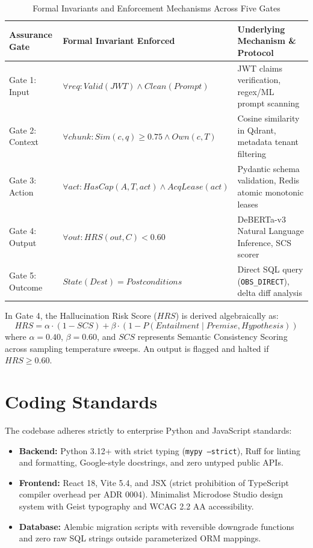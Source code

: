 \documentclass[12pt,a4paper]{report}
\numberwithin{equation}{section}
\begin{document}
\begin{table}[h!]
\centering
\caption{Formal Invariants and Enforcement Mechanisms Across Five Gates}
\vspace{4pt}
\begin{tabularx}{\textwidth}{l p{4.0cm} X}
\toprule
\textbf{Assurance Gate} & \textbf{Formal Invariant Enforced} & \textbf{Underlying Mechanism \& Protocol} \\
\midrule
Gate 1: Input & $\forall req: Valid(JWT) \land Clean(Prompt)$ & JWT claims verification, regex/ML prompt scanning \\
Gate 2: Context & $\forall chunk: Sim(c, q) \ge 0.75 \land Own(c, T)$ & Cosine similarity in Qdrant, metadata tenant filtering \\
Gate 3: Action & $\forall act: HasCap(A, T, act) \land AcqLease(act)$ & Pydantic schema validation, Redis atomic monotonic leases \\
Gate 4: Output & $\forall out: HRS(out, C) < 0.60$ & DeBERTa-v3 Natural Language Inference, SCS scorer \\
Gate 5: Outcome & $State(Dest) = Postconditions$ & Direct SQL query (\texttt{OBS\_DIRECT}), delta diff analysis \\
\bottomrule
\end{tabularx}
\end{table}

In Gate 4, the Hallucination Risk Score ($HRS$) is derived algebraically as:
\begin{equation}
HRS = \alpha \cdot (1 - SCS) + \beta \cdot (1 - P(Entailment \mid Premise, Hypothesis))
\end{equation}
where $\alpha = 0.40$, $\beta = 0.60$, and $SCS$ represents Semantic Consistency Scoring across sampling temperature sweeps. An output is flagged and halted if $HRS \ge 0.60$.

\section{Coding Standards}
The codebase adheres strictly to enterprise Python and JavaScript standards:
\begin{itemize}
    \item \textbf{Backend:} Python 3.12+ with strict typing (\texttt{mypy --strict}), Ruff for linting and formatting, Google-style docstrings, and zero untyped public APIs.
    \item \textbf{Frontend:} React 18, Vite 5.4, and JSX (strict prohibition of TypeScript compiler overhead per ADR 0004). Minimalist Microdose Studio design system with Geist typography and WCAG 2.2 AA accessibility.
    \item \textbf{Database:} Alembic migration scripts with reversible downgrade functions and zero raw SQL strings outside parameterized ORM mappings.
\end{itemize}
\end{document}
